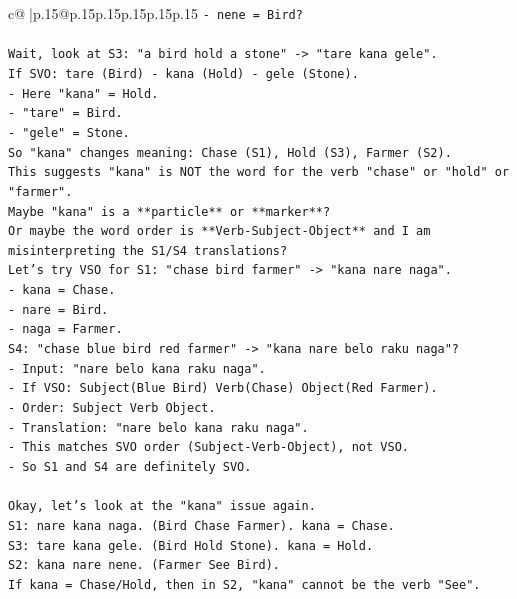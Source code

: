 \documentclass{article}
\begin{document}
{\begin{supertabular}{c@{$\;$}|p{.15\linewidth}@{}p{.15\linewidth}p{.15\linewidth}p{.15\linewidth}p{.15\linewidth}p{.15\linewidth}}
{{{\texttt{{-} nene = Bird?} \\
\\ 
\texttt{Wait, look at S3: "a bird hold a stone" {-}> "tare kana gele".} \\
\texttt{If SVO: tare (Bird) {-} kana (Hold) {-} gele (Stone).} \\
\texttt{{-} Here "kana" = Hold.} \\
\texttt{{-} "tare" = Bird.} \\
\texttt{{-} "gele" = Stone.} \\
\texttt{So "kana" changes meaning: Chase (S1), Hold (S3), Farmer (S2).} \\
\texttt{This suggests "kana" is NOT the word for the verb "chase" or "hold" or "farmer".} \\
\texttt{Maybe "kana" is a **particle** or **marker**?} \\
\texttt{Or maybe the word order is **Verb{-}Subject{-}Object** and I am misinterpreting the S1/S4 translations?} \\
\texttt{Let's try VSO for S1: "chase bird farmer" {-}> "kana nare naga".} \\
\texttt{{-} kana = Chase.} \\
\texttt{{-} nare = Bird.} \\
\texttt{{-} naga = Farmer.} \\
\texttt{S4: "chase blue bird red farmer" {-}> "kana nare belo raku naga"?} \\
\texttt{{-} Input: "nare belo kana raku naga".} \\
\texttt{{-} If VSO: Subject(Blue Bird) Verb(Chase) Object(Red Farmer).} \\
\texttt{{-} Order: Subject Verb Object.} \\
\texttt{{-} Translation: "nare belo kana raku naga".} \\
\texttt{{-} This matches SVO order (Subject{-}Verb{-}Object), not VSO.} \\
\texttt{{-} So S1 and S4 are definitely SVO.} \\
\\ 
\texttt{Okay, let's look at the "kana" issue again.} \\
\texttt{S1: nare kana naga. (Bird Chase Farmer). kana = Chase.} \\
\texttt{S3: tare kana gele. (Bird Hold Stone). kana = Hold.} \\
\texttt{S2: kana nare nene. (Farmer See Bird).} \\
\texttt{If kana = Chase/Hold, then in S2, "kana" cannot be the verb "See".} \\
}}}
\end{supertabular}}
\end{document}
